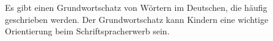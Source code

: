 Es gibt einen Grundwortschatz von Wörtern im Deutschen, die häufig geschrieben werden.
Der Grundwortschatz kann Kindern eine wichtige Orientierung beim Schriftspracherwerb sein.